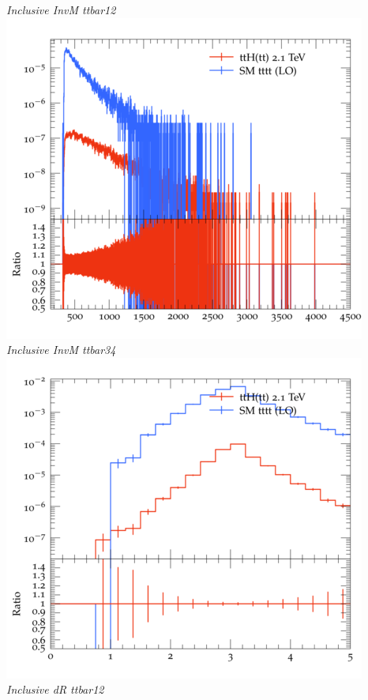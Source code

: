 \documentclass{beamer}
\begin{document}
\begin{frame}
\begin{columns}
\textit{\small Inclusive InvM ttbar12}
\includegraphics[width=\textwidth]{../plots/ttH_2100/tttt_ttH/Inclusive_InvM_ttbar34.png}\\
\textit{\small Inclusive InvM ttbar34}
\includegraphics[width=\textwidth]{../plots/ttH_2100/tttt_ttH/Inclusive_dR_ttbar12.png}\\
\textit{\small Inclusive dR ttbar12}
\end{columns}
\end{frame}
\end{document}
